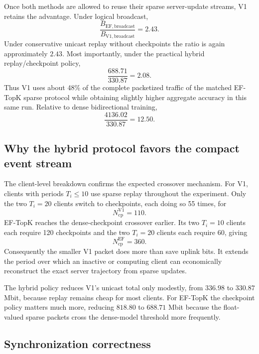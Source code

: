 Once both methods are allowed to reuse their sparse server-update streams, V1 retains the advantage. Under logical broadcast,
\begin{equation}
\frac{B_{\mathrm{EF,broadcast}}}{B_{\mathrm{V1,broadcast}}}
=2.43.
\end{equation}
Under conservative unicast replay without checkpoints the ratio is again approximately $2.43$. Most importantly, under the practical hybrid replay/checkpoint policy,
\begin{equation}
\frac{688.71}{330.87}=2.08.
\end{equation}
Thus V1 uses about 48\% of the complete packetized traffic of the matched EF-TopK sparse protocol while obtaining slightly higher aggregate accuracy in this same run. Relative to dense bidirectional training,
\begin{equation}
\frac{4136.02}{330.87}=12.50.
\end{equation}

\subsection{Why the hybrid protocol favors the compact event stream}

The client-level breakdown confirms the expected crossover mechanism. For V1, clients with periods $T_i\leq10$ use sparse replay throughout the experiment. Only the two $T_i=20$ clients switch to checkpoints, each doing so 55 times, for
\begin{equation}
N_{\mathrm{cp}}^{\mathrm{V1}}=110.
\end{equation}
EF-TopK reaches the dense-checkpoint crossover earlier. Its two $T_i=10$ clients each require 120 checkpoints and the two $T_i=20$ clients each require 60, giving
\begin{equation}
N_{\mathrm{cp}}^{\mathrm{EF}}=360.
\end{equation}
Consequently the smaller V1 packet does more than save uplink bits. It extends the period over which an inactive or computing client can economically reconstruct the exact server trajectory from sparse updates.

The hybrid policy reduces V1's unicast total only modestly, from $336.98$ to $330.87$ Mbit, because replay remains cheap for most clients. For EF-TopK the checkpoint policy matters much more, reducing $818.80$ to $688.71$ Mbit because the float-valued sparse packets cross the dense-model threshold more frequently.

\subsection{Synchronization correctness}

